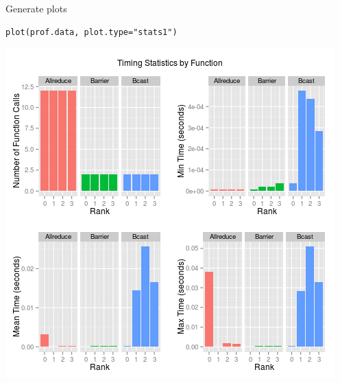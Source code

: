 \begin{frame}[fragile]
  \begin{block}{Generate plots}
  \begin{center}\vspace{-.6cm}
\begin{lstlisting}
plot(prof.data, plot.type="stats1")
\end{lstlisting}\vspace{-.2cm}
\includegraphics[scale=.39]{../common/pics/prof/stats1.png}
\end{center}
  \end{block}
\end{frame}


